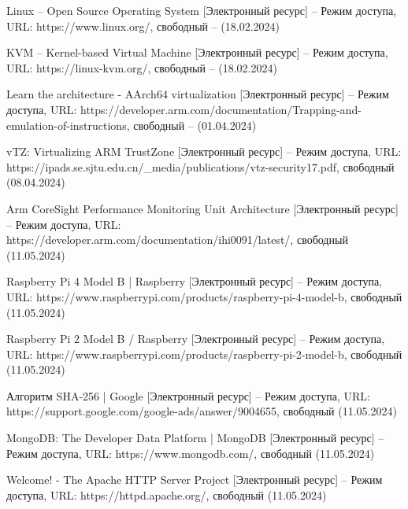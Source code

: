 \begin{thebibliography}{}
Linux -- Open Source Operating System [Электронный ресурс] – Режим доступа, URL: https://www.linux.org/, свободный – (18.02.2024)

KVM -- Kernel-based Virtual Machine [Электронный ресурс] – Режим доступа, URL: https://linux-kvm.org/, свободный – (18.02.2024)

Learn the architecture - AArch64 virtualization [Электронный ресурс] – Режим доступа, URL: https://developer.arm.com/documentation/Trapping-and-emulation-of-instructions, свободный – (01.04.2024)

vTZ: Virtualizing ARM TrustZone [Электронный ресурс] – Режим доступа, URL:
https://ipads.se.sjtu.edu.cn/\_media/publications/vtz-security17.pdf, свободный (08.04.2024)

Arm CoreSight Performance Monitoring Unit Architecture [Электронный ресурс] – Режим доступа, URL:
https://developer.arm.com/documentation/ihi0091/latest/, свободный (11.05.2024)

Raspberry Pi 4 Model B | Raspberry [Электронный ресурс] – Режим доступа, URL:
https://www.raspberrypi.com/products/raspberry-pi-4-model-b, свободный (11.05.2024)

Raspberry Pi 2 Model B / Raspberry [Электронный ресурс] – Режим доступа, URL:
https://www.raspberrypi.com/products/raspberry-pi-2-model-b, свободный (11.05.2024)

Алгоритм SHA-256 | Google [Электронный ресурс] – Режим доступа, URL:
https://support.google.com/google-ads/answer/9004655, свободный (11.05.2024)

MongoDB: The Developer Data Platform | MongoDB  [Электронный ресурс] – Режим доступа, URL:
https://www.mongodb.com/, свободный (11.05.2024)

Welcome! - The Apache HTTP Server Project [Электронный ресурс] – Режим доступа, URL:
https://httpd.apache.org/, свободный (11.05.2024)

\end{thebibliography}
\endgroup

\pagebreak